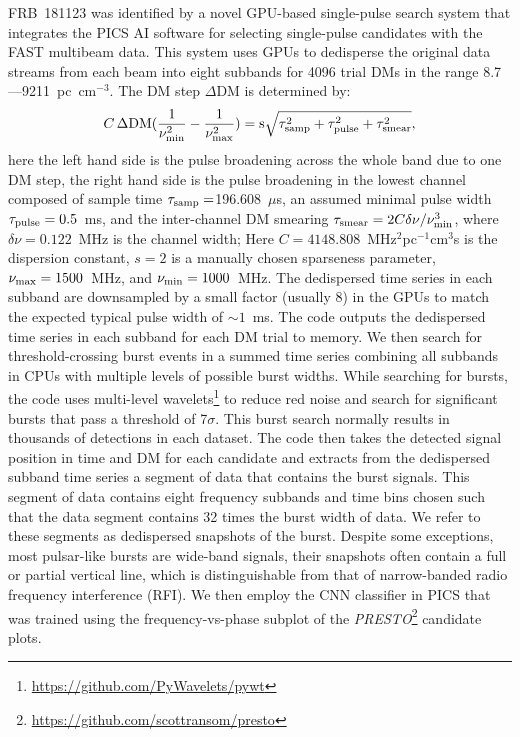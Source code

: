 FRB~181123 was identified by a novel GPU-based single-pulse search system that integrates the PICS AI software \citep{zbm+14} for selecting single-pulse candidates with the FAST multibeam data. This system uses GPUs to dedisperse the original data streams from each beam into eight subbands for 4096 trial DMs in the range 8.7---9211~pc~cm$^{-3}$. The DM step $\Delta$DM is determined by:
\begin{equation}
C \, \Delta \rm DM (\frac{1}{\nu^2_{\rm min}}-\frac{1}{\nu^2_{\rm max}}) = s \sqrt{\tau^2_{\rm samp} + \tau^2_{\rm pulse} + \tau^2_{\rm smear}},
\end{equation}
here the left hand side is the pulse broadening across the whole band due to one DM step, the right hand side is the pulse broadening in the lowest channel composed of sample time $\tau_{\rm samp}=$196.608~$\mu$s, an assumed minimal pulse width $\tau_{\rm pulse}=0.5$~ms, and the inter-channel DM smearing $\tau_{\rm smear}=2C\delta \nu/\nu^3_{\rm min}$, where $\delta \nu=0.122$~MHz is the channel width; Here $C=4148.808$~MHz$^2$pc$^{-1}$cm$^3$s is the dispersion constant, $s=2$ is a manually chosen sparseness parameter, $\nu_{\rm max}=1500$~MHz, and $\nu_{\rm min}=1000$~MHz. 
The dedispersed time series in each subband are downsampled by a small factor (usually 8) in the GPUs to match the expected typical pulse width of $\sim1$~ms. The code outputs the dedispersed time series in each subband for each DM trial to memory. We then search for threshold-crossing burst events in a summed time series combining all subbands in CPUs with multiple levels of possible burst widths. 
While searching for bursts, the code uses multi-level wavelets\footnote{\url{https://github.com/PyWavelets/pywt}} \citep{Lee2019}
to reduce red noise and search for significant bursts that pass a threshold of 7$\sigma$. 
This burst search normally results in thousands of detections in each dataset. The code then takes the detected signal position in time and DM for each candidate and extracts from the dedispersed subband time series a segment of data that contains the burst signals. This segment of data contains eight frequency subbands and time bins chosen such that the data segment contains 32 times the burst width of data. We refer to these segments as dedispersed snapshots of the burst. Despite some exceptions, most pulsar-like bursts are wide-band signals, their snapshots often contain a full or partial vertical line, which is distinguishable from that of narrow-banded radio frequency interference (RFI). We then employ the CNN classifier in PICS \citep{zbm+14} that was trained using the frequency-vs-phase subplot of the {\it PRESTO}\footnote{\url{https://github.com/scottransom/presto}} \citep{2011ascl.soft07017R} candidate plots. 

